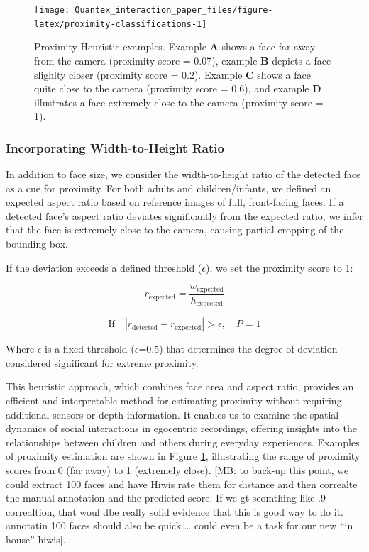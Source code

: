 \documentclass[
  man,floatsintext]{apa6}
\begin{document}
\begin{figure}

{\centering \texttt{[image: Quantex\_interaction\_paper\_files/figure-latex/proximity-classifications-1]} 

}

\caption{Proximity Heuristic examples. Example \textbf{A} shows a face far away from the camera (proximity score = 0.07), example \textbf{B} depicts a face slighlty closer (proximity score = 0.2). Example \textbf{C} shows a face quite close to the camera (proximity score = 0.6), and example \textbf{D} illustrates a face extremely close to the camera (proximity score = 1).}\label{fig:proximity-classifications}
\end{figure}

\subsubsection{Incorporating Width-to-Height Ratio}\label{incorporating-width-to-height-ratio}

In addition to face size, we consider the width-to-height ratio of the detected face as a cue for proximity. For both adults and children/infants, we defined an expected aspect ratio based on reference images of full, front-facing faces. If a detected face's aspect ratio deviates significantly from the expected ratio, we infer that the face is extremely close to the camera, causing partial cropping of the bounding box.

If the deviation exceeds a defined threshold (\(\epsilon\)), we set the proximity score to 1:

\[
r_{\text{expected}} = \frac{w_{\text{expected}}}{h_{\text{expected}}}
\]

\[
\text{If} \quad |r_{\text{detected}} - r_{\text{expected}}| > \epsilon, \quad P = 1
\]

Where \(\epsilon\) is a fixed threshold (\(\epsilon\)=0.5) that determines the degree of deviation considered significant for extreme proximity.

This heuristic approach, which combines face area and aspect ratio, provides an efficient and interpretable method for estimating proximity without requiring additional sensors or depth information. It enables us to examine the spatial dynamics of social interactions in egocentric recordings, offering insights into the relationships between children and others during everyday experiences. Examples of proximity estimation are shown in Figure \ref{fig:proximity-classifications}, illustrating the range of proximity scores from 0 (far away) to 1 (extremely close). {[}MB: to back-up this point, we could extract 100 faces and have Hiwis rate them for distance and then correalte the manual annotation and the predicted score. If we gt seomthing like .9 correaltion, that woul dbe really solid evidence that this is good way to do it. annotatin 100 faces should also be quick \ldots{} could even be a task for our new ``in house'' hiwis{]}.
\end{document}
